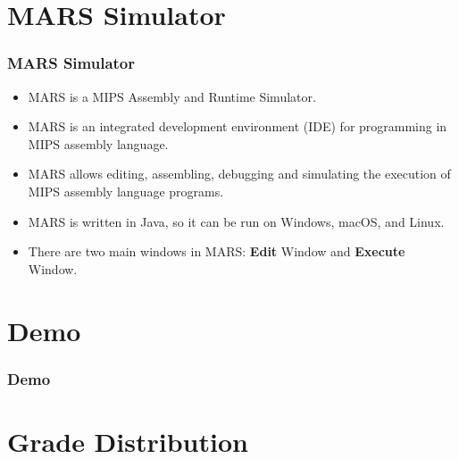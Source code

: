 \documentclass[
	11pt, %
]{beamer}
\begin{document}

\section{MARS Simulator}
\begin{frame}
	\frametitle{MARS Simulator}
	
	\begin{itemize}
		\item MARS is a MIPS Assembly and Runtime Simulator.
		\item MARS is an integrated development environment (IDE) for programming in MIPS assembly language.
		\item MARS allows editing, assembling, debugging and simulating the execution of MIPS assembly language programs.
		\item MARS is written in Java, so it can be run on Windows, macOS, and Linux.
		\item There are two main windows in MARS: \textbf{Edit} Window and \textbf{Execute} Window.
	\end{itemize}
\end{frame}


\section{Demo}

\begin{frame}
	\frametitle{Demo}
	
\end{frame}


\section{Grade Distribution}
\end{document}
